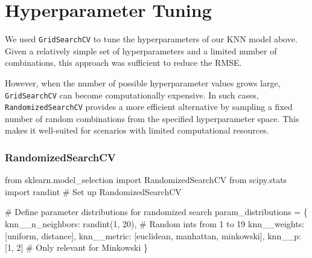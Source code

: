 \documentclass[
  letterpaper,
  DIV=11,
  numbers=noendperiod]{scrreprt}
\newenvironment{Shaded}{\begin{snugshade}}{\end{snugshade}}
\newcommand{\CommentTok}[1]{\textcolor[rgb]{0.37,0.37,0.37}{#1}}
\newcommand{\DecValTok}[1]{\textcolor[rgb]{0.68,0.00,0.00}{#1}}
\newcommand{\ImportTok}[1]{\textcolor[rgb]{0.00,0.46,0.62}{#1}}
\newcommand{\NormalTok}[1]{\textcolor[rgb]{0.00,0.23,0.31}{#1}}
\newcommand{\OperatorTok}[1]{\textcolor[rgb]{0.37,0.37,0.37}{#1}}
\newcommand{\StringTok}[1]{\textcolor[rgb]{0.13,0.47,0.30}{#1}}
\begin{document}
\section{Hyperparameter Tuning}\label{hyperparameter-tuning}

We used \texttt{GridSearchCV} to tune the hyperparameters of our KNN
model above. Given a relatively simple set of hyperparameters and a
limited number of combinations, this approach was sufficient to reduce
the RMSE.

However, when the number of possible hyperparameter values grows large,
\texttt{GridSearchCV} can become computationally expensive. In such
cases, \texttt{RandomizedSearchCV} provides a more efficient alternative
by sampling a fixed number of random combinations from the specified
hyperparameter space. This makes it well-suited for scenarios with
limited computational resources.

\subsubsection{RandomizedSearchCV}\label{randomizedsearchcv}

\begin{Shaded}
\begin{Highlighting}[]
\ImportTok{from}\NormalTok{ sklearn.model\_selection }\ImportTok{import}\NormalTok{ RandomizedSearchCV}
\ImportTok{from}\NormalTok{ scipy.stats }\ImportTok{import}\NormalTok{ randint}
\CommentTok{\# Set up RandomizedSearchCV}

\CommentTok{\# Define parameter distributions for randomized search}
\NormalTok{param\_distributions }\OperatorTok{=}\NormalTok{ \{}
    \StringTok{\textquotesingle{}knn\_\_n\_neighbors\textquotesingle{}}\NormalTok{: randint(}\DecValTok{1}\NormalTok{, }\DecValTok{20}\NormalTok{),  }\CommentTok{\# Random ints from 1 to 19}
    \StringTok{\textquotesingle{}knn\_\_weights\textquotesingle{}}\NormalTok{: [}\StringTok{\textquotesingle{}uniform\textquotesingle{}}\NormalTok{, }\StringTok{\textquotesingle{}distance\textquotesingle{}}\NormalTok{],}
    \StringTok{\textquotesingle{}knn\_\_metric\textquotesingle{}}\NormalTok{: [}\StringTok{\textquotesingle{}euclidean\textquotesingle{}}\NormalTok{, }\StringTok{\textquotesingle{}manhattan\textquotesingle{}}\NormalTok{, }\StringTok{\textquotesingle{}minkowski\textquotesingle{}}\NormalTok{],}
    \StringTok{\textquotesingle{}knn\_\_p\textquotesingle{}}\NormalTok{: [}\DecValTok{1}\NormalTok{, }\DecValTok{2}\NormalTok{]  }\CommentTok{\# Only relevant for Minkowski}
\NormalTok{\}}
\end{Highlighting}
\end{Shaded}
\end{document}
